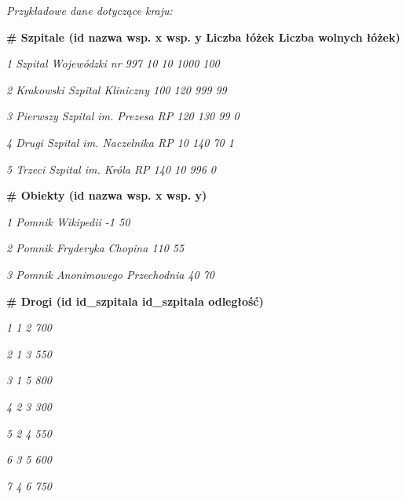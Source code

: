 ﻿\documentclass{article}
\begin{document}
\noindent \textit{Przyk{\l}adowe dane dotycz\k{a}ce kraju:}

\noindent {}

\noindent \textbf{\# Szpitale (id {\textbar} nazwa {\textbar} wsp. x {\textbar} wsp. y {\textbar} Liczba {\l}\'{o}\.{z}ek {\textbar} Liczba wolnych {\l}\'{o}\.{z}ek)}

\noindent \textit {1 {\textbar} Szpital Wojew\'{o}dzki nr 997 {\textbar} 10 {\textbar} 10 {\textbar} 1000 {\textbar} 100 }

\noindent \textit {2 {\textbar} Krakowski Szpital Kliniczny {\textbar} 100 {\textbar} 120 {\textbar} 999 {\textbar} 99 }

\noindent \textit {3 {\textbar} Pierwszy Szpital im. Prezesa RP {\textbar} 120 {\textbar} 130 {\textbar} 99 {\textbar} 0 }
 
\noindent \textit {4 {\textbar} Drugi Szpital im. Naczelnika RP {\textbar} 10 {\textbar} 140 {\textbar} 70 {\textbar} 1 }

\noindent \textit {5 {\textbar} Trzeci Szpital im. Kr\'{o}la RP {\textbar} 140 {\textbar} 10 {\textbar} 996 {\textbar} 0}

\noindent {}

\noindent \textbf {\# Obiekty (id {\textbar} nazwa {\textbar} wsp. x {\textbar} wsp. y) }

\noindent \textit {1 {\textbar} Pomnik Wikipedii {\textbar} -1 {\textbar} 50}

\noindent \textit {2 {\textbar} Pomnik Fryderyka Chopina {\textbar} 110 {\textbar} 55}

\noindent \textit {3 {\textbar} Pomnik Anonimowego Przechodnia {\textbar} 40 {\textbar} 70}

\noindent {}

\noindent \textbf{\# Drogi (id {\textbar} id\_szpitala {\textbar} id\_szpitala {\textbar} odleg{\l}o\'{s}\'{c}) }

\noindent \textit {1 {\textbar} 1 {\textbar} 2 {\textbar} 700}

\noindent \textit {2 {\textbar} 1 {\textbar} 3 {\textbar} 550}

\noindent \textit {3 {\textbar} 1 {\textbar} 5 {\textbar} 800}

\noindent \textit {4 {\textbar} 2 {\textbar} 3 {\textbar} 300}

\noindent \textit {5 {\textbar} 2 {\textbar} 4 {\textbar} 550}

\noindent \textit {6 {\textbar} 3 {\textbar} 5 {\textbar} 600}

\noindent \textit {7 {\textbar} 4 {\textbar} 6 {\textbar} 750}
\end{document}

